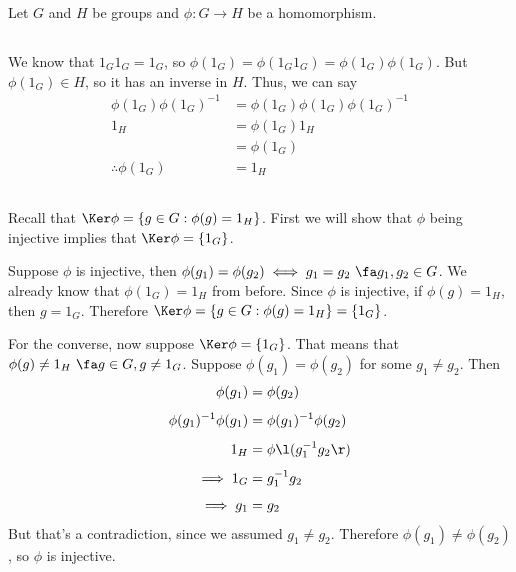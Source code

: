 \documentclass[a4paper]{article}
\begin{document}

Let $G$ and $H$ be groups and $\phi : G \to H$ be a homomorphism.

\subsection{}

We know that $1_G 1_G = 1_G$, so $\phi(1_G) = \phi(1_G 1_G) = \phi(1_G) \phi(1_G)$. But $\phi(1_G) \in H$, so it has an inverse in $H$. Thus, we can say \begin{align*}
	\phi(1_G) \phi(1_G)^{-1} &= \phi(1_G) \phi(1_G) \phi(1_G)^{-1}\\[1ex]
	1_H &= \phi(1_G) 1_H\\[1ex]
		&= \phi(1_G)\\[1ex]
	\therefore \phi(1_G) &= 1_H
\end{align*}

\subsection{}

Recall that $\Ker \phi = \{g \in G : \phi(g) = 1_H\}$. First we will show that $\phi$ being injective implies that $\Ker \phi = \{1_G\}$.

Suppose $\phi$ is injective, then $\phi(g_1) = \phi(g_2) \iff g_1 = g_2\ \fa g_1, g_2 \in G$. We already know that $\phi(1_G) = 1_H$ from before. Since $\phi$ is injective, if $\phi(g) = 1_H$, then $g = 1_G$. Therefore $\Ker \phi = \{g \in G : \phi(g) = 1_H\} = \{1_G\}$.

For the converse, now suppose $\Ker \phi = \{1_G\}$. That means that $\phi(g) \ne 1_H\ \fa g \in G, g \ne 1_G$. Suppose $\phi(g_1) = \phi(g_2)$ for some $g_1 \ne g_2$. Then \begin{align*}
	\phi(g_1) &= \phi(g_2)\\[1ex]
	\phi(g_1)^{-1} \phi(g_1) &= \phi(g_1)^{-1} \phi(g_2)\\[1ex]
	1_H &= \phi\l(g_1^{-1} g_2\r)\\[1ex]
	\implies 1_G &= g_1^{-1} g_2\\[1ex]
	\implies g_1 &= g_2
\end{align*}
But that's a contradiction, since we assumed $g_1 \ne g_2$. Therefore $\phi(g_1) \ne \phi(g_2)$, so $\phi$ is injective.

\subsection{}
\end{document}
